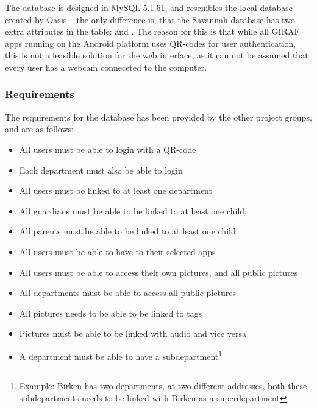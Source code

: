 The database is designed in MySQL 5.1.61, and resembles the local database created by Oasis -- the only difference is, that the Savannah database has two extra attributes in the  table:  and . The reason for this is that while all GIRAF apps running on the Android platform uses QR-codes for user authentication, this is not a feasible solution for the web interface, as it can not be assumed that every user has a webcam conneceted to the computer.

\subsubsection{Requirements}
The requirements for the database has been provided by the other project groups, and are as follows:

\begin{itemize} %
	\item All users must be able to login with a QR-code
	\item Each department must also be able to login
	\item All users must be linked to at least one department
	\item All guardians must be able to be linked to at least one child.
	\item All parents must be able to be linked to at least one child.
	\item All users must be able to have to their selected apps
	\item All users must be able to access their own pictures, and all public pictures
	\item All departments must be able to access all public pictures
	\item All pictures needs to be able to be linked to tags
	\item Pictures must be able to be linked with audio and vice versa
	\item A department must be able to have a subdepartment\footnote{Example: Birken has two departments, at two different addresses, both these subdepartments needs to be linked with Birken as a superdepartment}
\end{itemize}

